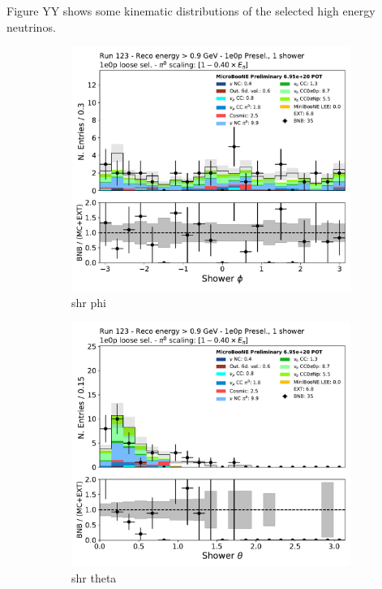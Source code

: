 Figure YY shows some kinematic distributions of the selected high energy neutrinos. 
\begin{figure}[H]
    \centering
    \begin{subfigure}{0.3\textwidth}
    \includegraphics[width=1.0\textwidth]{1e0p/High_E_Sideband/BDT_selection/shr_phi.pdf}
    \caption{shr phi}
    \end{subfigure}
    \begin{subfigure}{0.3\textwidth}
    \includegraphics[width=1.0\textwidth]{1e0p/High_E_Sideband/BDT_selection/shr_theta.pdf}
    \caption{shr theta}
    \end{subfigure}
    \caption{} 
    \label{fig:HE_1eNp_1}
\end{figure}

